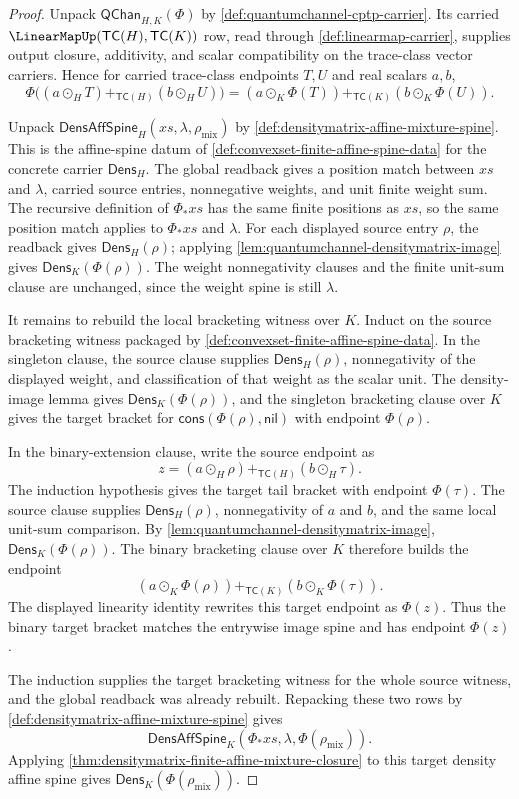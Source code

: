 \begin{proof}
Unpack $\mathsf{QChan}_{H,K}(\Phi)$ by \autoref{def:quantumchannel-cptp-carrier}. Its carried $\LinearMapUp(\mathsf{TC}(H),\mathsf{TC}(K))$ row, read through \autoref{def:linearmap-carrier}, supplies output closure, additivity, and scalar compatibility on the trace-class vector carriers. Hence for carried trace-class endpoints $T,U$ and real scalars $a,b$,
$$
\Phi\bigl((a\odot_H T)+_{\mathsf{TC}(H)}(b\odot_H U)\bigr)
=
(a\odot_K\Phi(T))+_{\mathsf{TC}(K)}(b\odot_K\Phi(U)).
$$

Unpack $\mathsf{DensAffSpine}_H(xs,\lambda,\rho_{\mathrm{mix}})$ by \autoref{def:densitymatrix-affine-mixture-spine}. This is the affine-spine datum of \autoref{def:convexset-finite-affine-spine-data} for the concrete carrier $\mathsf{Dens}_H$. The global readback gives a position match between $xs$ and $\lambda$, carried source entries, nonnegative weights, and unit finite weight sum. The recursive definition of $\Phi_{\ast}xs$ has the same finite positions as $xs$, so the same position match applies to $\Phi_{\ast}xs$ and $\lambda$. For each displayed source entry $\rho$, the readback gives $\mathsf{Dens}_H(\rho)$; applying \autoref{lem:quantumchannel-densitymatrix-image} gives $\mathsf{Dens}_K(\Phi(\rho))$. The weight nonnegativity clauses and the finite unit-sum clause are unchanged, since the weight spine is still $\lambda$.

It remains to rebuild the local bracketing witness over $K$. Induct on the source bracketing witness packaged by \autoref{def:convexset-finite-affine-spine-data}. In the singleton clause, the source clause supplies $\mathsf{Dens}_H(\rho)$, nonnegativity of the displayed weight, and classification of that weight as the scalar unit. The density-image lemma gives $\mathsf{Dens}_K(\Phi(\rho))$, and the singleton bracketing clause over $K$ gives the target bracket for $\mathsf{cons}(\Phi(\rho),\mathsf{nil})$ with endpoint $\Phi(\rho)$.

In the binary-extension clause, write the source endpoint as
$$
z=(a\odot_H\rho)+_{\mathsf{TC}(H)}(b\odot_H\tau).
$$
The induction hypothesis gives the target tail bracket with endpoint $\Phi(\tau)$. The source clause supplies $\mathsf{Dens}_H(\rho)$, nonnegativity of $a$ and $b$, and the same local unit-sum comparison. By \autoref{lem:quantumchannel-densitymatrix-image}, $\mathsf{Dens}_K(\Phi(\rho))$. The binary bracketing clause over $K$ therefore builds the endpoint
$$
(a\odot_K\Phi(\rho))+_{\mathsf{TC}(K)}(b\odot_K\Phi(\tau)).
$$
The displayed linearity identity rewrites this target endpoint as $\Phi(z)$. Thus the binary target bracket matches the entrywise image spine and has endpoint $\Phi(z)$.

The induction supplies the target bracketing witness for the whole source witness, and the global readback was already rebuilt. Repacking these two rows by \autoref{def:densitymatrix-affine-mixture-spine} gives
$$
\mathsf{DensAffSpine}_K(\Phi_{\ast}xs,\lambda,\Phi(\rho_{\mathrm{mix}})).
$$
Applying \autoref{thm:densitymatrix-finite-affine-mixture-closure} to this target density affine spine gives $\mathsf{Dens}_K(\Phi(\rho_{\mathrm{mix}}))$.
\end{proof}
